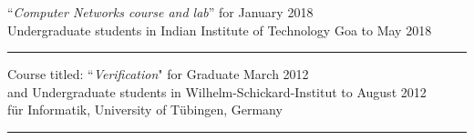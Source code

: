\documentclass[margin]{res}
\begin{document}
\begin{resume}
					``\emph{Computer Networks course and lab}'' for  \hfill January 2018 \\
					Undergraduate students in Indian Institute of Technology Goa \hfill to May 2018 \\
					\noindent\rule{13cm}{0.4pt}
					Course titled: ``\emph{Verification}" for Graduate  \hfill March 2012  \\
					and Undergraduate students in Wilhelm-Schickard-Institut \hfill to August 2012\\ 
					f\"ur Informatik, University of T\"ubingen, Germany \\
					\noindent\rule{13cm}{0.4pt} \\



\end{resume}
\end{document}
